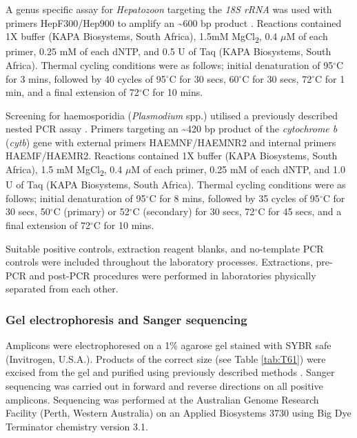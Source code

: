 \documentclass[a4paper, nobind]{templates/ociamthesis}
\begin{document}
A genus specific assay for \emph{Hepatozoon} targeting the \emph{18S rRNA} was used with primers HepF300/Hep900 to amplify an \textasciitilde600 bp product \autocite{ujvariHighPrevalenceHepatozoon2004}. Reactions contained 1X buffer (KAPA Biosystems, South Africa), 1.5mM MgCl\textsubscript{2}, 0.4 \(\mu\)M of each primer, 0.25 mM of each dNTP, and 0.5 U of Taq (KAPA Biosystems, South Africa). Thermal cycling conditions were as follows; initial denaturation of 95\(^\circ\)C for 3 mins, followed by 40 cycles of 95\(^\circ\)C for 30 secs, 60\(^\circ\)C for 30 secs, 72\(^\circ\)C for 1 min, and a final extension of 72\(^\circ\)C for 10 mins.

Screening for haemosporidia (\emph{Plasmodium} spp.) utilised a previously described nested PCR assay \autocite{waldenstromNewNestedPolymerase2004}. Primers targeting an \textasciitilde420 bp product of the \emph{cytochrome b} (\emph{cytb}) gene with external primers HAEMNF/HAEMNR2 and internal primers HAEMF/HAEMR2. Reactions contained 1X buffer (KAPA Biosystems, South Africa), 1.5 mM MgCl\textsubscript{2}, 0.4 \(\mu\)M of each primer, 0.25 mM of each dNTP, and 1.0 U of Taq (KAPA Biosystems, South Africa). Thermal cycling conditions were as follows; initial denaturation of 95\(^\circ\)C for 8 mins, followed by 35 cycles of 95\(^\circ\)C for 30 secs, 50\(^\circ\)C (primary) or 52\(^\circ\)C (secondary) for 30 secs, 72\(^\circ\)C for 45 secs, and a final extension of 72\(^\circ\)C for 10 mins.

Suitable positive controls, extraction reagent blanks, and no-template PCR controls were included throughout the laboratory processes. Extractions, pre-PCR and post-PCR procedures were performed in laboratories physically separated from each other.

\hypertarget{gel-electrophoresis-and-sanger-sequencing}{%
\subsubsection{Gel electrophoresis and Sanger sequencing}\label{gel-electrophoresis-and-sanger-sequencing}}

Amplicons were electrophoresed on a 1\% agarose gel stained with SYBR safe (Invitrogen, U.S.A.). Products of the correct size (see Table \ref{tab:T61}) were excised from the gel and purified using previously described methods \autocite{yangSpecificQuantitativeDetection2013}. Sanger sequencing was carried out in forward and reverse directions on all positive amplicons. Sequencing was performed at the Australian Genome Research Facility (Perth, Western Australia) on an Applied Biosystems 3730 using Big Dye Terminator chemistry version 3.1.
\end{document}
